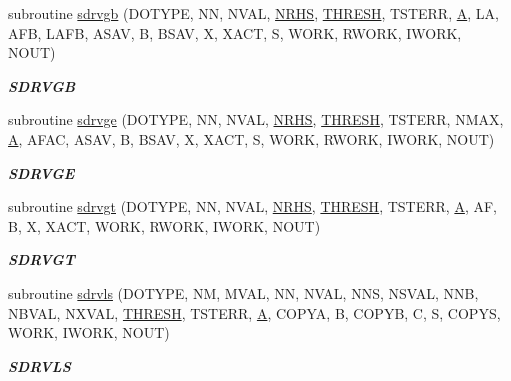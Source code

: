 \begin{DoxyCompactItemize}
subroutine \hyperlink{group__single__lin_ga7c4d228ebd9a9b1b3ca81876d8ce45dc}{sdrvgb} (D\+O\+T\+Y\+P\+E, N\+N, N\+V\+A\+L, \hyperlink{example__user_8c_aa0138da002ce2a90360df2f521eb3198}{N\+R\+H\+S}, \hyperlink{zlaqgs_8c_a0656018abfc9fa2821827415f5d5ea57}{T\+H\+R\+E\+S\+H}, T\+S\+T\+E\+R\+R, \hyperlink{classA}{A}, L\+A, A\+F\+B, L\+A\+F\+B, A\+S\+A\+V, B, B\+S\+A\+V, X, X\+A\+C\+T, S, W\+O\+R\+K, R\+W\+O\+R\+K, I\+W\+O\+R\+K, N\+O\+U\+T)
\begin{DoxyCompactList}\small\item\em {\bfseries S\+D\+R\+V\+G\+B} \end{DoxyCompactList}\item 
subroutine \hyperlink{group__single__lin_gaad062a357c0cb8ec4189efbf605dc45c}{sdrvge} (D\+O\+T\+Y\+P\+E, N\+N, N\+V\+A\+L, \hyperlink{example__user_8c_aa0138da002ce2a90360df2f521eb3198}{N\+R\+H\+S}, \hyperlink{zlaqgs_8c_a0656018abfc9fa2821827415f5d5ea57}{T\+H\+R\+E\+S\+H}, T\+S\+T\+E\+R\+R, N\+M\+A\+X, \hyperlink{classA}{A}, A\+F\+A\+C, A\+S\+A\+V, B, B\+S\+A\+V, X, X\+A\+C\+T, S, W\+O\+R\+K, R\+W\+O\+R\+K, I\+W\+O\+R\+K, N\+O\+U\+T)
\begin{DoxyCompactList}\small\item\em {\bfseries S\+D\+R\+V\+G\+E} \end{DoxyCompactList}\item 
subroutine \hyperlink{group__single__lin_ga51a4ae280be36d98abc64f2c70b5fe93}{sdrvgt} (D\+O\+T\+Y\+P\+E, N\+N, N\+V\+A\+L, \hyperlink{example__user_8c_aa0138da002ce2a90360df2f521eb3198}{N\+R\+H\+S}, \hyperlink{zlaqgs_8c_a0656018abfc9fa2821827415f5d5ea57}{T\+H\+R\+E\+S\+H}, T\+S\+T\+E\+R\+R, \hyperlink{classA}{A}, A\+F, B, X, X\+A\+C\+T, W\+O\+R\+K, R\+W\+O\+R\+K, I\+W\+O\+R\+K, N\+O\+U\+T)
\begin{DoxyCompactList}\small\item\em {\bfseries S\+D\+R\+V\+G\+T} \end{DoxyCompactList}\item 
subroutine \hyperlink{group__single__lin_gaa320f3dd3a03036eaff38e736f03afb6}{sdrvls} (D\+O\+T\+Y\+P\+E, N\+M, M\+V\+A\+L, N\+N, N\+V\+A\+L, N\+N\+S, N\+S\+V\+A\+L, N\+N\+B, N\+B\+V\+A\+L, N\+X\+V\+A\+L, \hyperlink{zlaqgs_8c_a0656018abfc9fa2821827415f5d5ea57}{T\+H\+R\+E\+S\+H}, T\+S\+T\+E\+R\+R, \hyperlink{classA}{A}, C\+O\+P\+Y\+A, B, C\+O\+P\+Y\+B, C, S, C\+O\+P\+Y\+S, W\+O\+R\+K, I\+W\+O\+R\+K, N\+O\+U\+T)
\begin{DoxyCompactList}\small\item\em {\bfseries S\+D\+R\+V\+L\+S} \end{DoxyCompactList}\item 

\end{DoxyCompactItemize}
